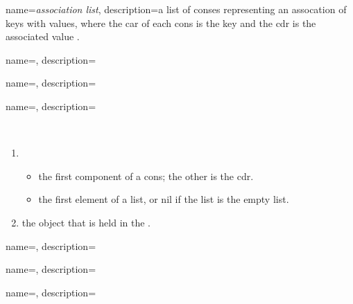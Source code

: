 {
  name={\sl association list},
  description={a list of \gls{cons}es representing an assocation of
    keys with values, where the \gls{car} of each \gls{cons} is the key and
    the \gls{cdr} is the associated value \citep{hyperspec-glossary}.}
}

{
  name={},
  description={\ \\ }
}

{
  name={},
  description={\ \\ }
}

{
  name={},
  description={\ \\
    \begin{enumerate}
    \item
      \begin{itemize}
      \item the first component of a \gls{cons}; the other is the \gls{cdr}.
      \item the first element of a list, or \gls{nil} if the list is the empty
        list.
      \end{itemize}
    \item the object that is held in the . 
    \end{enumerate}%
    \citet*{hyperspec-glossary}%
  }
}

{
  name={},
  description={\ \\ }
}


{
  name={},
  description={\ \\ }
}

{
  name={},
  description={\ \\ }
}